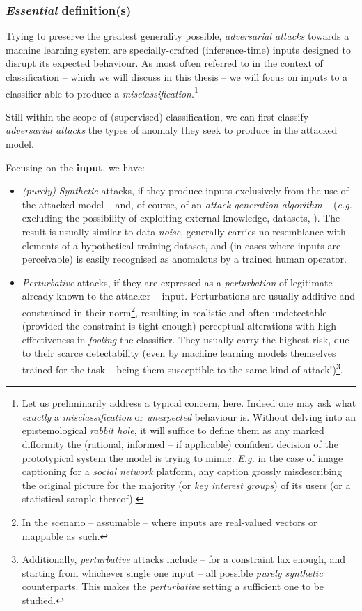 \subsubsection{\textit{Essential} definition(s)}
Trying to preserve the greatest generality possible, \textit{adversarial attacks} towards a machine learning system are specially-crafted (inference-time) inputs designed to disrupt its expected behaviour. As most often referred to in the context of classification -- which we will discuss in this thesis -- we will focus on inputs to a classifier able to produce a \textit{misclassification}.\footnote{Let us preliminarily address a typical concern, here. Indeed one may ask what \textit{exactly} a \textit{misclassification} or \textit{unexpected} behaviour is. Without delving into an epistemological \textit{rabbit hole}, it will suffice to define them as any marked difformity \wrt the (rational, informed -- if applicable) confident decision of the prototypical system the model is trying to mimic. \textit{E.g.} in the case of image captioning for a \textit{social network} platform, any caption grossly misdescribing the original picture for the majority (or \textit{key interest groups}) of its users (or a statistical sample thereof).}

Still within the scope of (supervised) classification, we can first classify \textit{adversarial attacks} \wrt the types of anomaly they seek to produce in the attacked model.

Focusing on the \textbf{input}, we have:
\begin{itemize}
    \item \textit{(purely)} \textit{Synthetic} attacks, if they produce inputs exclusively from the use of the attacked model -- and, of course, of an \textit{attack generation algorithm} -- (\textit{e.g.} excluding the possibility of exploiting external knowledge, datasets, \etc). The result is usually similar to data \textit{noise}, generally carries no resemblance with elements of a hypothetical training dataset, and (in cases where inputs are perceivable) is easily recognised as anomalous by a trained human operator.
    \item \textit{Perturbative} attacks, if they are expressed as a \textit{perturbation} of legitimate -- already known to the attacker -- input. Perturbations are usually additive and constrained in their norm\footnote{In the scenario -- assumable \wlogg -- where inputs are real-valued vectors or mappable as such.}, resulting in realistic and often undetectable (provided the constraint is tight enough) perceptual alterations with high effectiveness in \textit{fooling} the classifier. They usually carry the highest risk, due to their scarce detectability (even by machine learning models themselves trained for the task -- being them susceptible to the same kind of attack!)\footnote{Additionally, \textit{perturbative} attacks include -- for a constraint lax enough, and starting from whichever single one input -- all possible \textit{purely synthetic} counterparts. This makes the \textit{perturbative} setting a sufficient one to be studied.}.
\end{itemize}

